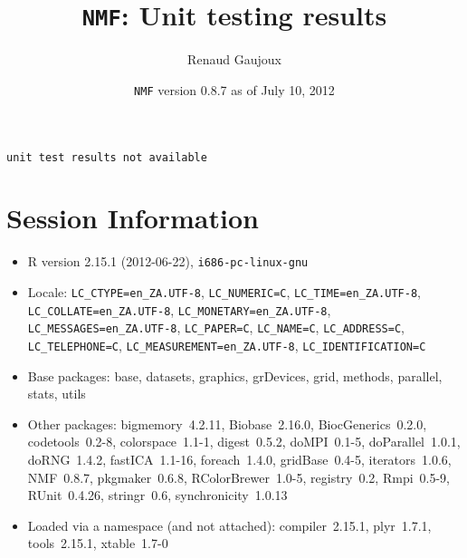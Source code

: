 \documentclass[10pt]{article}
\author{Renaud Gaujoux}
\title{\texttt{NMF}: Unit testing results}
\date{\texttt{NMF} version 0.8.7 as of July 10, 2012}
\begin{document}
\maketitle

\begin{verbatim}
unit test results not available
\end{verbatim}

\section*{Session Information}
\begin{itemize}\raggedright
  \item R version 2.15.1 (2012-06-22), \verb|i686-pc-linux-gnu|
  \item Locale: \verb|LC_CTYPE=en_ZA.UTF-8|, \verb|LC_NUMERIC=C|, \verb|LC_TIME=en_ZA.UTF-8|, \verb|LC_COLLATE=en_ZA.UTF-8|, \verb|LC_MONETARY=en_ZA.UTF-8|, \verb|LC_MESSAGES=en_ZA.UTF-8|, \verb|LC_PAPER=C|, \verb|LC_NAME=C|, \verb|LC_ADDRESS=C|, \verb|LC_TELEPHONE=C|, \verb|LC_MEASUREMENT=en_ZA.UTF-8|, \verb|LC_IDENTIFICATION=C|
  \item Base packages: base, datasets, graphics, grDevices, grid,
    methods, parallel, stats, utils
  \item Other packages: bigmemory~4.2.11, Biobase~2.16.0,
    BiocGenerics~0.2.0, codetools~0.2-8, colorspace~1.1-1,
    digest~0.5.2, doMPI~0.1-5, doParallel~1.0.1, doRNG~1.4.2,
    fastICA~1.1-16, foreach~1.4.0, gridBase~0.4-5, iterators~1.0.6,
    NMF~0.8.7, pkgmaker~0.6.8, RColorBrewer~1.0-5, registry~0.2,
    Rmpi~0.5-9, RUnit~0.4.26, stringr~0.6, synchronicity~1.0.13
  \item Loaded via a namespace (and not attached): compiler~2.15.1,
    plyr~1.7.1, tools~2.15.1, xtable~1.7-0
\end{itemize}
\end{document}
